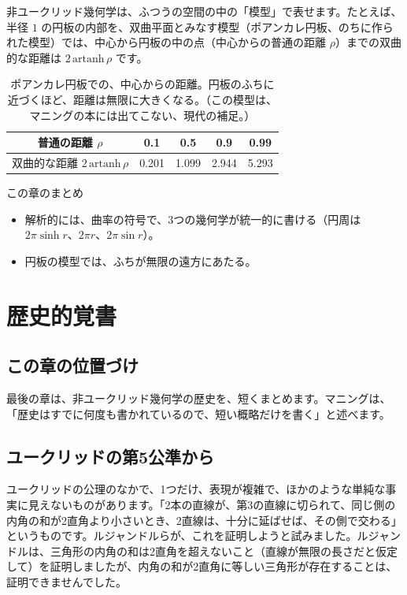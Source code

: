 \documentclass[a4paper,11pt,openany]{ltjsbook}
\begin{document}
非ユークリッド幾何学は、ふつうの空間の中の「模型」で表せます。たとえば、半径 $1$ の円板の内部を、双曲平面とみなす模型（ポアンカレ円板、のちに作られた模型）では、中心から円板の中の点（中心からの普通の距離 $\rho$）までの双曲的な距離は $2\,\mathrm{artanh}\,\rho$ です。

\begin{table}[htbp]
\centering
\begin{tabular}{c|cccc}
\toprule
普通の距離 $\rho$ & 0.1 & 0.5 & 0.9 & 0.99\\
\midrule
双曲的な距離 $2\,\mathrm{artanh}\,\rho$ & 0.201 & 1.099 & 2.944 & 5.293\\
\bottomrule
\end{tabular}
\caption{ポアンカレ円板での、中心からの距離。円板のふちに近づくほど、距離は無限に大きくなる。（この模型は、マニングの本には出てこない、現代の補足。）}
\end{table}

\begin{pointbox}{この章のまとめ}
\begin{itemize}[leftmargin=*]
\item 解析的には、曲率の符号で、3つの幾何学が統一的に書ける（円周は $2\pi\sinh r$、$2\pi r$、$2\pi\sin r$）。
\item 円板の模型では、ふちが無限の遠方にあたる。
\end{itemize}
\end{pointbox}

\chapter{歴史的覚書}

\section{この章の位置づけ}

最後の章は、非ユークリッド幾何学の歴史を、短くまとめます。マニングは、「歴史はすでに何度も書かれているので、短い概略だけを書く」と述べます。

\section{ユークリッドの第5公準から}

ユークリッドの公理のなかで、1つだけ、表現が複雑で、ほかのような単純な事実に見えないものがあります。「2本の直線が、第3の直線に切られて、同じ側の内角の和が2直角より小さいとき、2直線は、十分に延ばせば、その側で交わる」というものです。ルジャンドルらが、これを証明しようと試みました。ルジャンドルは、三角形の内角の和は2直角を超えないこと（直線が無限の長さだと仮定して）を証明しましたが、内角の和が2直角に等しい三角形が存在することは、証明できませんでした。
\end{document}
